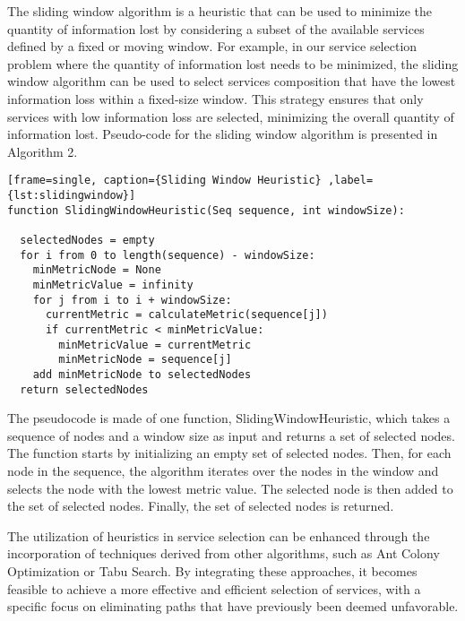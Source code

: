 The sliding window algorithm is a heuristic that can be used to minimize the quantity of information lost by considering a subset of the available services defined by a fixed or moving window.
For example, in our service selection problem where the quantity of information lost needs to be minimized, the sliding window algorithm can be used to select services composition that have the lowest information loss within a fixed-size window.
This strategy ensures that only services with low information loss are selected, minimizing the overall quantity of information lost.
Pseudo-code for the sliding window algorithm is presented in Algorithm 2.
\begin{lstlisting}[frame=single, caption={Sliding Window Heuristic} ,label={lst:slidingwindow}]
function SlidingWindowHeuristic(Seq sequence, int windowSize):

  selectedNodes = empty
  for i from 0 to length(sequence) - windowSize:
    minMetricNode = None
    minMetricValue = infinity
    for j from i to i + windowSize:
      currentMetric = calculateMetric(sequence[j])
      if currentMetric < minMetricValue:
        minMetricValue = currentMetric
        minMetricNode = sequence[j]
    add minMetricNode to selectedNodes
  return selectedNodes
\end{lstlisting}
The pseudocode is made of one function, SlidingWindowHeuristic, which takes a sequence of nodes and a window size as input and returns a set of selected nodes.
The function starts by initializing an empty set of selected nodes.
Then, for each node in the sequence, the algorithm iterates over the nodes in the window and selects the node with the lowest metric value.
The selected node is then added to the set of selected nodes.
Finally, the set of selected nodes is returned.


The utilization of heuristics in service selection can be enhanced through the incorporation of techniques derived from other algorithms, such as Ant Colony Optimization or Tabu Search.
By integrating these approaches, it becomes feasible to achieve a more effective and efficient selection of services, with a specific focus on eliminating paths that have previously been deemed unfavorable.

